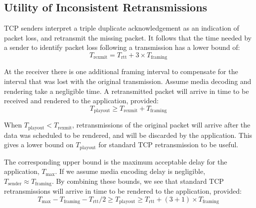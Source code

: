 
\subsection{Utility of Inconsistent Retransmissions} \label{subsec:rexmit}

TCP senders interpret a triple duplicate acknowledgement as an
indication of packet loss, and retransmit the missing packet. It follows that
the time needed by a sender to identify packet loss following a transmission
has a lower bound of:
\begin{equation}
  \label{eq:retransmission}
  T_\mathrm{rexmit} = T_\mathrm{rtt} + 3 \times T_\mathrm{framing}
\end{equation}

At the receiver there is one additional framing interval to compensate for the
interval that was lost with the original transmission.
Assume media decoding and rendering take a negligible time. A
retransmitted packet will arrive in time to be received and rendered to the
application, provided:
\begin{equation}
  \label{eq:playout_lower}
  T_\mathrm{playout} \geq T_\mathrm{rexmit} + T_\mathrm{framing}
\end{equation}

When $T_\mathrm{playout} < T_\mathrm{rexmit}$, retransmissions of the
original packet will arrive after the data was scheduled to be rendered, and
will be discarded by the application. This gives a lower bound on
$T_\mathrm{playout}$ for standard TCP retransmission to be useful.

The corresponding upper bound
is the maximum acceptable delay for the application,%
$T_\mathrm{max}$.
If we assume media encoding delay is negligible, $T_\mathrm{sender} \approx
T_\mathrm{framing}$. By combining these bounds, we see that standard TCP
retransmissions will arrive in time to be rendered to the
application, provided:
\begin{equation}
   T_\mathrm{max} - T_\mathrm{framing} - T_\mathrm{rtt}/2
   \geq
   T_\mathrm{playout} \geq T_\mathrm{rtt} + (3+1) \times T_\mathrm{framing}
\label{eq:standard-rexmit}
\end{equation}

